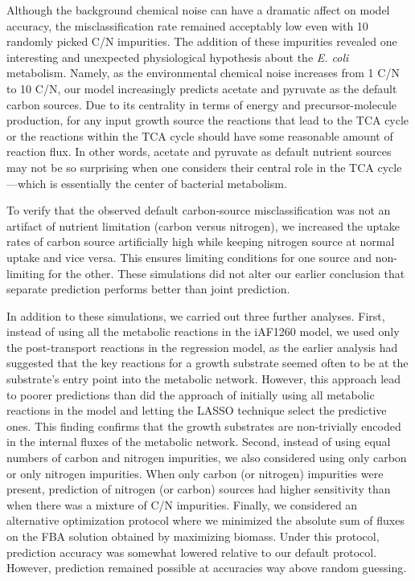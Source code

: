 \documentclass[12pt]{article}
\begin{document}
Although the background chemical noise can have a dramatic affect on model accuracy, the misclassification rate remained acceptably low even with 10 randomly picked C/N impurities. The addition of these impurities revealed one interesting and unexpected physiological hypothesis about the \emph{E. coli} metabolism. Namely, as the environmental chemical noise increases from 1 C/N to 10 C/N, our model increasingly predicts acetate and pyruvate as the default carbon sources. Due to its centrality in terms of energy and precursor-molecule production, for any input growth source the reactions that lead to the TCA cycle or the reactions within the TCA cycle should have some reasonable amount of reaction flux. In other words, acetate and pyruvate as default nutrient sources may not be so surprising when one considers their central role in the TCA cycle---which is essentially the center of bacterial metabolism. 

To verify that the observed default carbon-source misclassification was not an artifact of nutrient limitation (carbon versus nitrogen), we increased the uptake rates of carbon source artificially high while keeping nitrogen source at normal uptake and vice versa. This ensures limiting conditions for one source and non-limiting for the other. These simulations did not alter our earlier conclusion that separate prediction performs better than joint prediction.

In addition to these simulations, we carried out three further analyses. First, instead of using all the metabolic reactions in the iAF1260 model, we used only the post-transport reactions in the regression model, as the earlier analysis had suggested that the key reactions for a growth substrate seemed often to be at the substrate's entry point into the metabolic network. However, this approach lead to poorer predictions than did the approach of initially using all metabolic reactions in the model and letting the LASSO technique select the predictive ones. This finding confirms that the growth substrates are non-trivially encoded in the internal fluxes of the metabolic network. Second, instead of using equal numbers of carbon and nitrogen impurities, we also considered using only carbon or only nitrogen impurities. When only carbon (or nitrogen) impurities were present, prediction of nitrogen (or carbon) sources had higher sensitivity than when there was a mixture of C/N impurities. Finally, we considered an alternative optimization protocol where we minimized the absolute sum of fluxes on the FBA solution obtained by maximizing biomass. Under this protocol, prediction accuracy was somewhat lowered relative to our default protocol. However, prediction remained possible at accuracies way above random guessing.
\end{document}
